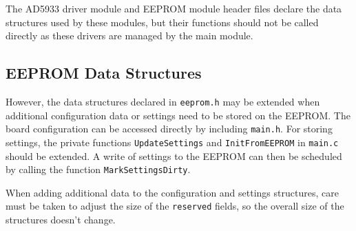 The AD5933 driver module and EEPROM module header files declare the data structures used by these modules, but their
functions should not be called directly as these drivers are managed by the main module.

\subsection{EEPROM Data Structures}

However, the data structures declared in \verb!eeprom.h! may be extended when additional configuration data or settings
need to be stored on the EEPROM. The board configuration can be accessed directly by including \verb!main.h!.
For storing settings, the private functions \verb!UpdateSettings! and \verb!InitFromEEPROM! in \verb!main.c! should
be extended. A write of settings to the EEPROM can then be scheduled by calling the function \verb!MarkSettingsDirty!.

When adding additional data to the configuration and settings structures, care must be taken to adjust the size of the
\verb!reserved! fields, so the overall size of the structures doesn't change.

